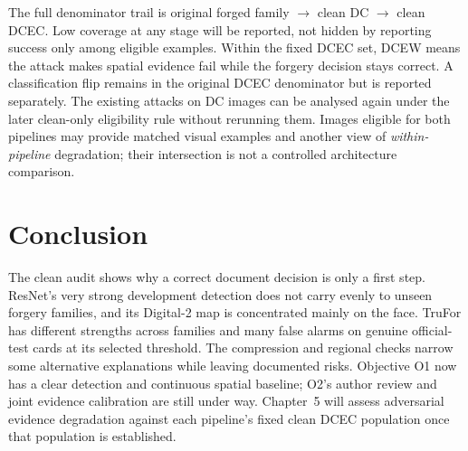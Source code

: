 The full denominator trail is original forged family $\rightarrow$ clean DC $\rightarrow$ clean DCEC. Low coverage at any stage will be reported, not hidden by reporting success only among eligible examples. Within the fixed DCEC set, DCEW means the attack makes spatial evidence fail while the forgery decision stays correct. A classification flip remains in the original DCEC denominator but is reported separately. The existing attacks on DC images can be analysed again under the later clean-only eligibility rule without rerunning them. Images eligible for both pipelines may provide matched visual examples and another view of \emph{within-pipeline} degradation; their intersection is not a controlled architecture comparison.

\section{Conclusion}
\label{sec:clean-conclusion}

The clean audit shows why a correct document decision is only a first step. ResNet's very strong development detection does not carry evenly to unseen forgery families, and its Digital-2 map is concentrated mainly on the face. TruFor has different strengths across families and many false alarms on genuine official-test cards at its selected threshold. The compression and regional checks narrow some alternative explanations while leaving documented risks. Objective O1 now has a clear detection and continuous spatial baseline; O2's author review and joint evidence calibration are still under way. Chapter~5 will assess adversarial evidence degradation against each pipeline's fixed clean DCEC population once that population is established.
